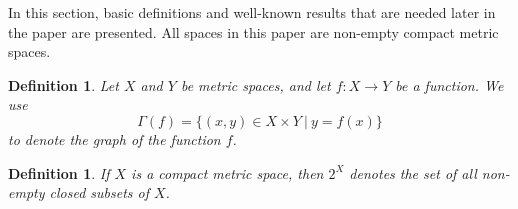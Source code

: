 \documentclass[a4paper,12pt]{article} %
\newtheorem{definition}[theorem]{Definition}
\newtheorem{observation}[theorem]{Observation}
\newcommand{\Cl}  {\mathop{\rm Cl}\nolimits}
\newcommand{\Int}  {\mathop{\rm Int}\nolimits}
\begin{document}
In this section, basic definitions and well-known results that are needed later in the paper are presented. All spaces in this paper are non-empty compact metric spaces.
\begin{definition}
Let $X$ and $Y$ be metric spaces, and let $f:X\rightarrow Y$ be a function.  We use  
$$
\Gamma(f)=\{(x,y)\in X\times Y \ | \ y=f(x)\}
$$
to denote \emph{ \color{blue} the graph of the function $f$}.
\end{definition}
\begin{definition}
If $X$ is a compact metric space, then \emph{ \color{blue}  $2^X$ }denotes the set of all  non-empty closed subsets of $X$.  
\end{definition}
\end{document}
